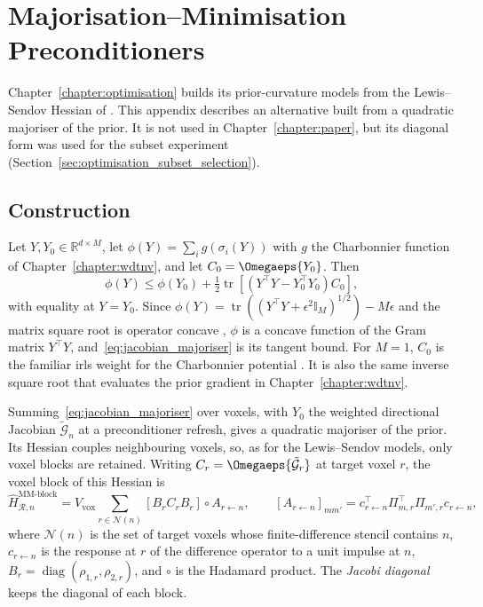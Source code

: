 \chapter{Majorisation--Minimisation Preconditioners}
\label{app:mm_preconditioner}

Chapter~\ref{chapter:optimisation} builds its prior-curvature models from the Lewis--Sendov Hessian of \wdtnv. This appendix describes an alternative built from a quadratic majoriser of the prior. It is not used in Chapter~\ref{chapter:paper}, but its diagonal form was used for the subset experiment (Section~\ref{sec:optimisation_subset_selection}).

\section{Construction}

Let $Y,Y_0\in\mathbb{R}^{d\times M}$, let $\phi(Y)=\sum_{i}g(\sigma_i(Y))$ with $g$ the Charbonnier function of Chapter~\ref{chapter:wdtnv}, and let $C_0=\Omegaeps{Y_0}$. Then
\begin{equation}
    \phi(Y)
    \leq
    \phi(Y_0)
    +\tfrac12\operatorname{tr}\!\left[\left(Y^\top Y-Y_0^\top Y_0\right)C_0\right],
    \label{eq:jacobian_majoriser}
\end{equation}
with equality at $Y=Y_0$. Since $\phi(Y)=\operatorname{tr}((Y^\top Y+\epsilon^2\mathbb{I}_M)^{1/2})-M\epsilon$ and the matrix square root is operator concave \cite{bhatiaMatrixAnalysis1997a}, $\phi$ is a concave function of the Gram matrix $Y^\top Y$, and~\eqref{eq:jacobian_majoriser} is its tangent bound. For $M=1$, $C_0$ is the familiar \gls{irls} weight for the Charbonnier potential \cite{fessler_image_2017,charbonnier_deterministic_1997}. It is also the same inverse square root that evaluates the prior gradient in Chapter~\ref{chapter:wdtnv}.

Summing~\eqref{eq:jacobian_majoriser} over voxels, with $Y_0$ the weighted directional Jacobian $\tilde{\mathcal G}_n$ at a preconditioner refresh, gives a quadratic majoriser of the prior. Its Hessian couples neighbouring voxels, so, as for the Lewis--Sendov models, only voxel blocks are retained. Writing $C_r=\Omegaeps{\tilde{\mathcal G}_r}$ at target voxel $r$, the voxel block of this Hessian is
\begin{equation}
    \widehat H_{\mathcal R,n}^{\mathrm{MM\text{-}block}}
    =
    V_{\mathrm{vox}}
    \sum_{r\in\mathcal N(n)}
    \left[B_rC_rB_r\right]\circ A_{r\leftarrow n},
    \qquad
    [A_{r\leftarrow n}]_{mm'}
    =
    c_{r\leftarrow n}^\top\Pi_{m,r}^\top\Pi_{m',r}c_{r\leftarrow n},
    \label{eq:mm_block_preconditioner}
\end{equation}
where $\mathcal N(n)$ is the set of target voxels whose finite-difference stencil contains $n$, $c_{r\leftarrow n}$ is the response at $r$ of the difference operator to a unit impulse at $n$, $B_r=\operatorname{diag}(\rho_{1,r},\rho_{2,r})$, and $\circ$ is the Hadamard product. The \emph{Jacobi diagonal} keeps the diagonal of each block.

